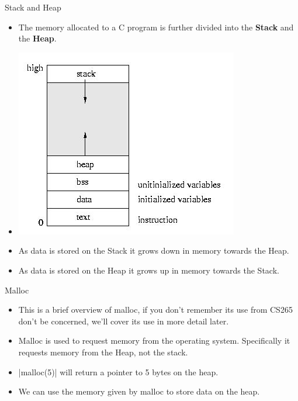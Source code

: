 \documentclass{beamer}
\begin{document}
\begin{frame}{Stack and Heap}
	\begin{itemize}[<+->]
	\item The memory allocated to a C program is further divided into the {\bf Stack} and the {\bf Heap}.

	\item \includegraphics[scale=0.40]{imgs/stackandheap.jpeg}

	\item As data is stored on the Stack it grows down in memory towards the Heap.

	\item As data is stored on the Heap it grows up in memory towards the Stack.

	\end{itemize}
\end{frame}

\begin{frame}{Malloc}
	\begin{itemize}[<+->]
		\item This is a brief overview of malloc, if you don't remember its use from CS265 don't be concerned, we'll cover its use in more detail later.

		\item Malloc is used to request memory from the operating system. Specifically it requests memory from the Heap, not the stack.

		\item {}|malloc(5)| will return a pointer to 5 bytes on the heap.

		\item We can use the memory given by malloc to store data on the heap.
	\end{itemize}
\end{frame}
\end{document}
